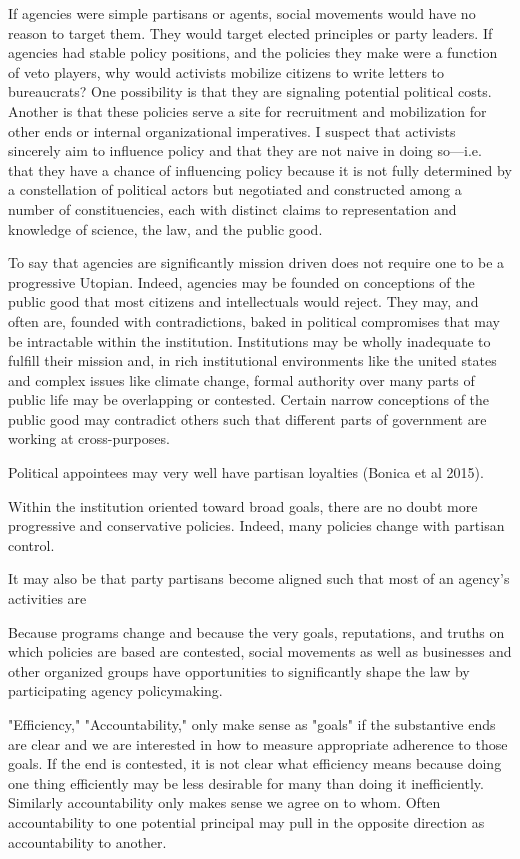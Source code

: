  
 
If agencies were simple partisans or agents, social movements would have no reason to target them. They would target elected principles or party leaders. If agencies had stable policy positions, and the policies they make were a function of veto players, why would activists mobilize citizens to write letters to bureaucrats? One possibility is that they are signaling potential political costs. Another is that these policies serve a site for recruitment and mobilization for other ends or internal organizational imperatives. I suspect that activists sincerely aim to influence policy and that they are not naive in doing so—i.e. that they have a chance of influencing policy because it is not fully determined by a constellation of political actors but negotiated and constructed among a number of constituencies, each with distinct claims to representation and knowledge of science, the law, and the public good. 


To say that agencies are significantly mission driven does not require one to be a progressive Utopian. Indeed, agencies may be founded on conceptions of the public good that most citizens and intellectuals would reject. They may, and often are, founded with contradictions, baked in political compromises that may be intractable within the institution. Institutions may be wholly inadequate to fulfill their mission and, in rich institutional environments like the united states and complex issues like climate change, formal authority over many parts of public life may be overlapping or contested. Certain narrow conceptions of the public good may contradict others such that different parts of government are working at cross-purposes. 

Political appointees may very well have partisan loyalties  (Bonica et al 2015).

Within the institution oriented toward broad goals, there are no doubt more progressive and conservative policies. Indeed, many policies change with partisan control. 

It may also be that party partisans become aligned such that most of an agency's activities are 

Because programs change and because the very goals, reputations, and truths on which policies are based are contested, social movements as well as businesses and other organized groups have opportunities to significantly shape the law by participating agency policymaking. 

"Efficiency," "Accountability," only make sense as "goals" if the substantive ends are clear and we are interested in how to measure appropriate adherence to those goals. If the end is contested, it is not clear what efficiency means because doing one thing efficiently may be less desirable for many than doing it inefficiently. Similarly accountability only makes sense we agree on to whom. Often accountability to one potential principal may pull in the opposite direction as accountability to another. 

